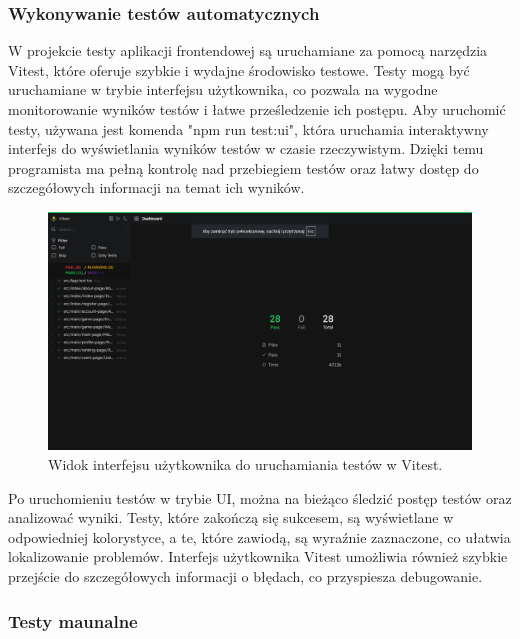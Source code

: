\documentclass[twoside]{projektInzynierskiMS1}
\begin{document}
\newpage

\subsubsection{Wykonywanie testów automatycznych}

\noindent
W projekcie testy aplikacji frontendowej są uruchamiane za pomocą narzędzia Vitest, które oferuje szybkie i wydajne środowisko testowe. Testy mogą być uruchamiane w trybie interfejsu użytkownika, co pozwala na wygodne monitorowanie wyników testów i łatwe prześledzenie ich postępu. Aby uruchomić testy, używana jest komenda "npm run test:ui", która uruchamia interaktywny interfejs do wyświetlania wyników testów w czasie rzeczywistym. Dzięki temu programista ma pełną kontrolę nad przebiegiem testów oraz łatwy dostęp do szczegółowych informacji na temat ich wyników.

\vspace{0.5cm}
\begin{figure}[h!]
    \centering
    \includegraphics[width=1\textwidth]{images/tests_front.png}
    \caption{Widok interfejsu użytkownika do uruchamiania testów w Vitest.}
\end{figure}
\vspace{0.5cm}

\noindent
Po uruchomieniu testów w trybie UI, można na bieżąco śledzić postęp testów oraz analizować wyniki. Testy, które zakończą się sukcesem, są wyświetlane w odpowiedniej kolorystyce, a te, które zawiodą, są wyraźnie zaznaczone, co ułatwia lokalizowanie problemów. Interfejs użytkownika Vitest umożliwia również szybkie przejście do szczegółowych informacji o błędach, co przyspiesza debugowanie.

\newpage

\subsubsection{Testy maunalne}
\end{document}
